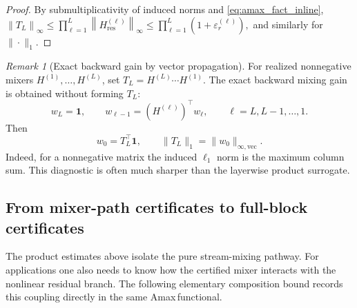 \documentclass[11pt]{article}
\numberwithin{equation}{section}
\theoremstyle{plain}
\theoremstyle{definition}
\theoremstyle{remark}
\newtheorem{remark}[theorem]{Remark}
\newcommand{\ones}{\mathbf{1}}
\newcommand{\norm}[1]{\left\lVert #1 \right\rVert}
\newcommand{\Hres}{H_{\mathrm{res}}}
\newcommand{\Amax}{\textsf{Amax}\,}
\begin{document}
\begin{proof}
By submultiplicativity of induced norms and \eqref{eq:amax_fact_inline},
\(
\norm{T_L}_\infty
\le
\prod_{\ell=1}^L \norm{\Hres^{(\ell)}}_\infty
\le
\prod_{\ell=1}^L (1+\varepsilon_r^{(\ell)}),
\)
and similarly for $\|\cdot\|_1$.
\end{proof}

\begin{remark}[Exact backward gain by vector propagation]
\label{rem:exact-backward-gain}
For realized nonnegative mixers $H^{(1)},\dots,H^{(L)}$, set
$T_L=H^{(L)}\cdots H^{(1)}$. The exact backward mixing gain is obtained without forming $T_L$:
\begin{equation}\label{eq:exact-backward-vector-prop}
        w_L=\ones,\qquad
        w_{\ell-1}=(H^{(\ell)})^\top w_\ell,
        \qquad \ell=L,L-1,\dots,1.
\end{equation}
Then
\begin{equation}\label{eq:exact-backward-gain}
        w_0=T_L^\top\ones,
        \qquad
        \|T_L\|_1=\|w_0\|_{\infty,\mathrm{vec}}.
\end{equation}
Indeed, for a nonnegative matrix the induced $\ell_1$ norm is the maximum column sum. This diagnostic is often much sharper than the layerwise product surrogate.
\end{remark}


\subsection{From mixer-path certificates to full-block certificates}\label{subsec:full_block_certificate}
The product estimates above isolate the pure stream-mixing pathway. For applications one also needs to know how the certified mixer interacts with the nonlinear residual branch. The following elementary composition bound records this coupling directly in the same \Amax functional.
\end{document}
